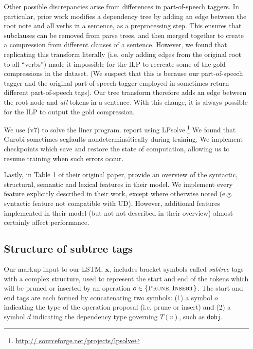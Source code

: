 Other possible discrepancies arise from differences in part-of-speech taggers. In particular, prior work modifies a dependency tree by adding an edge between the root note and all verbs in a sentence, as a preprocessing step. This ensures that subclauses can be removed from parse trees, and then merged together to create a compression from different clauses of a sentence. However, we found that replicating this transform literally (i.e. only adding edges from the original root to all ``verbs'') made it impossible for the ILP to recreate some of the gold compressions in the dataset. (We suspect that this is because our part-of-speech tagger and the original part-of-speech tagger employed in \citet{filippova2013overcoming} sometimes return different part-of-speech tags). Our tree transform therefore adds an edge between the root node and \textit{all} tokens in a sentence. With this change, it is always possible for the ILP to output the gold compression.

We use \citet{gurobi} (v7) to solve the liner program. \citet{filippova2008dependency} report using LPsolve.\footnote{\url{http://
sourceforge.net/projects/lpsolve}}  We found that Gurobi sometimes segfaults nondeterminsitically during training. We implement checkpoints which save and restore the state of computation, allowing us to resume training when such errors occur. 

Lastly, in Table 1 of their original paper, \citet{filippova2013overcoming} provide an overview of the syntactic, structural, semantic and lexical features in their model. We implement every feature explicitly described in their work, except where otherwise noted (e.g. syntactic feature not compatible with UD). However, additional features implemented in their model (but not not described in their overview) almost certainly affect performance. 

\subsection{Structure of subtree tags}\label{s:subtree}

Our markup input to our LSTM, $\bm{x}$, includes bracket symbols called \textit{subtree} tags with a complex structure, used to represent the start and end of the tokens which will be pruned or inserted by an operation $o \in \{ \textsc{Prune},\textsc{Insert}\}$. The start and end tags are each formed by concatenating two symbols: (1) a symbol $o$ indicating the type of the operation proposal (i.e. prune or insert) and (2) a symbol $d$ indicating the dependency type governing $T(v)$, such as \texttt{dobj}. 

